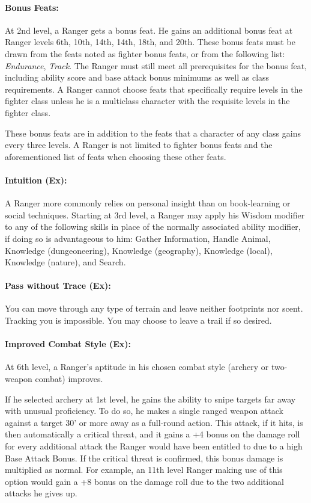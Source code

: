 \paragraph{Bonus Feats:}
At 2nd level, a Ranger gets a bonus feat.
He gains an additional bonus feat at Ranger levels 6th, 10th, 14th, 14th, 18th, and 20th. 
These bonus feats must be drawn from the feats noted as fighter bonus feats, or from the following list: \emph{Endurance}, \emph{Track}. 
The Ranger must still meet all prerequisites for the bonus feat, including ability score and base attack bonus minimums as well as class requirements. 
A Ranger cannot choose feats that specifically require levels in the fighter class unless he is a multiclass character with the requisite levels in the fighter class.

These bonus feats are in addition to the feats that a character of any class gains every three levels. 
A Ranger is not limited to fighter bonus feats and the aforementioned list of feats when choosing these other feats.
\paragraph{Intuition (Ex):}
A Ranger more commonly relies on personal insight than on book-learning or social techniques.
Starting at 3rd level, a Ranger may apply his Wisdom modifier to any of the following skills in place of the normally associated ability modifier, if doing so is advantageous to him:
Gather Information, Handle Animal, Knowledge (dungeoneering), Knowledge (geography), Knowledge (local), Knowledge (nature), and Search.

\paragraph{Pass without Trace (Ex):}
You can move through any type of terrain and leave neither footprints nor scent. Tracking you is impossible. You may choose to leave a trail if so desired.

\paragraph{Improved Combat Style (Ex):}
At 6th level, a Ranger's aptitude in his chosen combat style (archery or two-weapon combat) improves.

If he selected archery at 1st level, he gains the ability to snipe targets far away with unusual proficiency.
To do so, he makes a single ranged weapon attack against a target 30' or more away as a full-round action.
This attack, if it hits, is then automatically a critical threat, and it gains a +4 bonus on the damage roll for every additional attack the Ranger would have been entitled to due to a high Base Attack Bonus. If the critical threat is confirmed, this bonus damage is multiplied as normal. 
For example, an 11th level Ranger making use of this option would gain a +8 bonus on the damage roll due to the two additional attacks he gives up.

